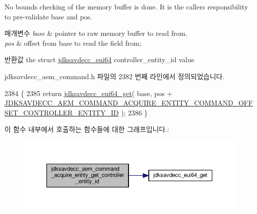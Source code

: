 No bounds checking of the memory buffer is done. It is the caller\textquotesingle{}s responsibility to pre-\/validate base and pos.


\begin{DoxyParams}{매개변수}
{\em base} & pointer to raw memory buffer to read from. \\
\hline
{\em pos} & offset from base to read the field from; \\
\hline
\end{DoxyParams}
\begin{DoxyReturn}{반환값}
the struct \hyperlink{structjdksavdecc__eui64}{jdksavdecc\+\_\+eui64} controller\+\_\+entity\+\_\+id value 
\end{DoxyReturn}


jdksavdecc\+\_\+aem\+\_\+command.\+h 파일의 2382 번째 라인에서 정의되었습니다.


\begin{DoxyCode}
2384 \{
2385     \textcolor{keywordflow}{return} \hyperlink{group__eui64_ga2652311a25a6b91cddbed75c108c7031}{jdksavdecc\_eui64\_get}( base, pos + 
      \hyperlink{group__command__acquire__entity_ga54037d79f4c31d797f2af0e37b2030cd}{JDKSAVDECC\_AEM\_COMMAND\_ACQUIRE\_ENTITY\_COMMAND\_OFFSET\_CONTROLLER\_ENTITY\_ID}
       );
2386 \}
\end{DoxyCode}


이 함수 내부에서 호출하는 함수들에 대한 그래프입니다.\+:
\nopagebreak
\begin{figure}[H]
\begin{center}
\leavevmode
\includegraphics[width=350pt]{group__command__acquire__entity_ga5eb9376430954ecd096a2ceb1fefd12b_cgraph}
\end{center}
\end{figure}


